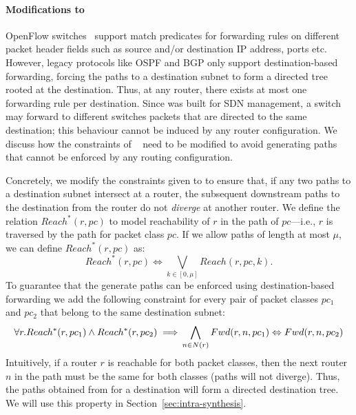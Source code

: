 \paragraph{Modifications to \genesis}
OpenFlow switches~\cite{openflow} support match predicates for
forwarding rules on different packet header fields such as source
and/or destination IP address, ports etc. However, legacy protocols
like OSPF and BGP only support destination-based forwarding, 
forcing the paths to a destination subnet to 
form a directed tree rooted at the destination. 
Thus,
at any router, there exists at most one forwarding rule per destination. 
Since \genesis was built for
SDN management,  a switch may forward to different switches
packets that are directed to the same destination;
this behaviour cannot be induced by any router
configuration. We  discuss how the
constraints of \genesis~\cite{genesis}
need to be modified to avoid generating paths that 
cannot be enforced by any routing configuration.

Concretely, we modify the constraints given to \genesis to ensure that,
if any two paths to a destination subnet intersect at a router,
the subsequent downstream paths to the destination from the
router do not \emph{diverge} at another router.  
We define the relation $Reach^*(r,pc)$ to model reachability 
of $r$ in the path of $pc$---i.e., $r$ is traversed by the path for packet class $pc$. 
If we allow paths of length at most $\mu$, we can define $Reach^*(r,pc)$ as:
\begin{equation}
	Reach^*(r,pc) \Leftrightarrow \bigvee_{k \in [0, \mu]} Reach(r, pc, k).
\end{equation}
To guarantee that the generate paths can be enforced using destination-based
forwarding we add
the following constraint for every pair of packet classes $pc_1$ and $pc_2$ that belong to the same 
 destination subnet:
 \begin{equation}
 \forall r. Reach^*(r, pc_1) \wedge Reach^*(r, pc_2) 
 \implies \\ \bigwedge_{n \in N(r)} Fwd(r, n, pc_1) \Leftrightarrow Fwd(r, n, pc_2)
 \end{equation}
Intuitively, 
 if a router $r$ is reachable for both packet classes, 
 then the next router $n$ in the path must be the same for both classes
 (paths will not diverge). Thus, the paths obtained
 from \genesis for a destination will form a 
 directed destination tree.
 We will use this property in Section~\ref{sec:intra-synthesis}. 

